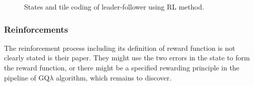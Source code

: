 \begin{figure}
	\centering
	\caption{States and tile coding of leader-follower using RL method.}
	\label{fig:leaderfollowerrl}
\end{figure}

\subsubsection{Reinforcements}

The reinforcement process including its definition of reward function is not clearly stated is their paper.
They might use the two errors in the state to form the reward function, or there might be a specified rewarding principle in the pipeline of GQ$\lambda$ algorithm, which remains to discover.

